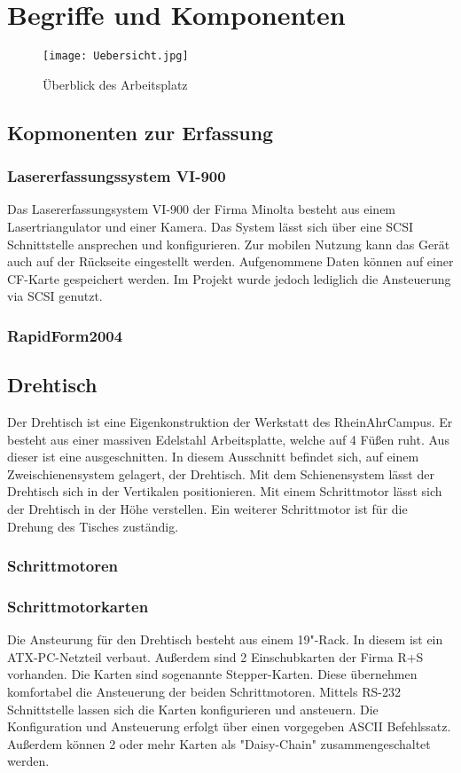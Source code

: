 \chapter{Begriffe und Komponenten}
\label{cha:Begriffe}
\begin{figure}[htb]
\centering
\texttt{[image: Uebersicht.jpg]}
\caption{Überblick des Arbeitsplatz}
\label{fig:Übersicht}
\end{figure}
\section{Kopmonenten zur Erfassung}
\subsection{Lasererfassungssystem VI-900}
Das Lasererfassungsystem VI-900 der Firma Minolta besteht aus einem Lasertriangulator und einer Kamera. Das System lässt sich über eine SCSI Schnittstelle ansprechen und konfigurieren. Zur mobilen Nutzung kann das Gerät auch auf der Rückseite eingestellt werden. Aufgenommene Daten können auf einer CF-Karte gespeichert werden. Im Projekt wurde jedoch lediglich die Ansteuerung via SCSI genutzt.
\subsection{RapidForm2004}
\section{Drehtisch}
Der Drehtisch ist eine Eigenkonstruktion der Werkstatt des RheinAhrCampus. Er besteht aus einer massiven Edelstahl Arbeitsplatte, welche auf 4 Füßen ruht. Aus dieser ist eine  ausgeschnitten. In diesem Ausschnitt befindet sich, auf einem Zweischienensystem gelagert, der Drehtisch. Mit dem Schienensystem lässt der Drehtisch sich in der Vertikalen positionieren. Mit einem Schrittmotor lässt sich der Drehtisch in der Höhe verstellen. Ein weiterer Schrittmotor ist für die Drehung des Tisches zuständig.   
\subsection{Schrittmotoren}
\subsection{Schrittmotorkarten}
Die Ansteurung für den Drehtisch besteht aus einem 19"-Rack. In diesem ist ein ATX-PC-Netzteil verbaut. Außerdem sind 2 Einschubkarten der Firma R+S vorhanden. Die Karten sind sogenannte Stepper-Karten. Diese übernehmen komfortabel die Ansteuerung der beiden Schrittmotoren. Mittels RS-232 Schnittstelle lassen sich die Karten konfigurieren und ansteuern. Die Konfiguration und Ansteuerung erfolgt über einen vorgegeben ASCII Befehlssatz. Außerdem können 2 oder mehr Karten als "Daisy-Chain" zusammengeschaltet werden. 
